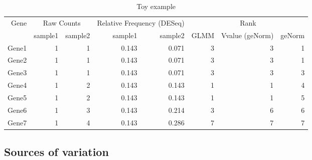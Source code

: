 \documentclass[11pt, a4paper]{article}
\begin{document}
\begin{table}[ht]
	\centering
	\caption{Toy example}
	\label{table:toyexample2}
	\begin{tabular}{rrrrrrrr}
		\hline
	Gene & \multicolumn{2}{c}{Raw Counts} & \multicolumn{2}{c}{Relative Frequency (DESeq)} & \multicolumn{3}{c}{Rank} \\
		& sample1 & sample2 & sample1 &sample2 & GLMM & Vvalue (geNorm) & geNorm \\ 
		\hline
		Gene1 & 1 & 1 & 0.143 & 0.071 & 3 & 3 & 1 \\ 
		Gene2 & 1 & 1 & 0.143 & 0.071 & 3 & 3 & 1 \\ 
		Gene3 & 1 & 1 & 0.143 & 0.071 & 3 & 3 & 3 \\ 
		Gene4 & 1 & 2 & 0.143 & 0.143 & 1 & 1 & 4 \\ 
		Gene5 & 1 & 2 & 0.143 & 0.143 & 1 & 1 & 5 \\ 
		Gene6 & 1 & 3 & 0.143 & 0.214 & 3 & 6 & 6 \\ 
		Gene7 & 1 & 4 & 0.143 & 0.286 & 7 & 7 & 7 \\ 
		\hline
	\end{tabular}
\end{table}







\subsection{Sources of variation}\label{Section:varianceComp}
\end{document}
